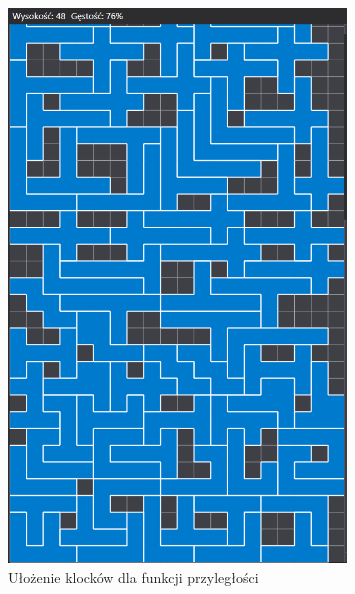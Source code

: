 \documentclass{article}
\begin{document}
\begin{enumerate}
\begin{figure}[H]
\centering
\includegraphics[width=0.8\textwidth]{przyleglosc.PNG}
\caption{Ułożenie klocków dla funkcji przyległości}
\end{figure}

\end{enumerate}
\end{document}
